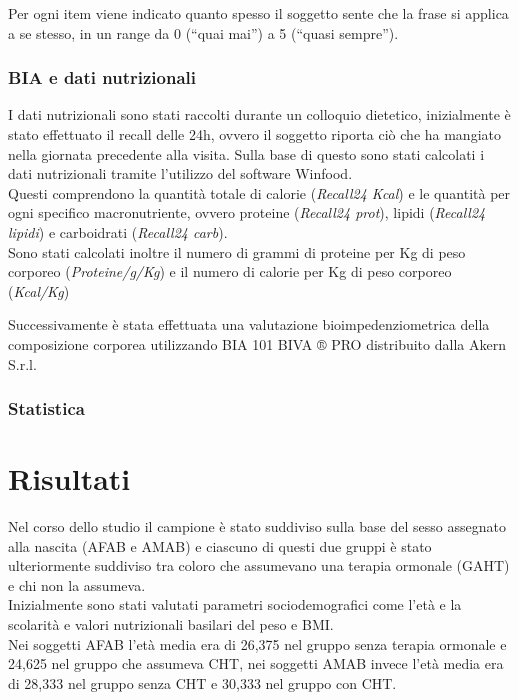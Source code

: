 \documentclass[12pt]{article}
\begin{document}
Per ogni item viene indicato quanto spesso il soggetto sente che la frase si applica a se stesso, in un range da 0 (``quai mai'') a 5 (``quasi sempre'').
\subsubsection{BIA e dati nutrizionali}
\label{sec:org8050c52}
I dati nutrizionali sono stati raccolti durante un colloquio dietetico, inizialmente è stato effettuato il recall delle 24h, ovvero il soggetto riporta ciò che ha mangiato nella giornata precedente alla visita. Sulla base di questo sono stati calcolati i dati nutrizionali tramite l'utilizzo del software Winfood.\\
Questi comprendono la quantità totale di calorie (\emph{Recall24 Kcal}) e le quantità per ogni specifico macronutriente, ovvero proteine (\emph{Recall24 prot}), lipidi (\emph{Recall24 lipidi}) e carboidrati (\emph{Recall24 carb}).\\
Sono stati calcolati inoltre il numero di grammi di proteine per Kg di peso corporeo (\emph{Proteine/g/Kg}) e il numero di calorie per Kg di peso corporeo (\emph{Kcal/Kg})

Successivamente è stata effettuata una valutazione bioimpedenziometrica della composizione corporea utilizzando BIA 101 BIVA ® PRO distribuito dalla Akern S.r.l.
\subsubsection{Statistica}
\label{sec:orgee2d86c}
\section{Risultati}
\label{sec:orgd22a09c}
Nel corso dello studio il campione è stato suddiviso sulla base del sesso assegnato alla nascita (AFAB e AMAB) e ciascuno di questi due gruppi è stato ulteriormente suddiviso tra coloro che assumevano una terapia ormonale (GAHT) e chi non la assumeva.\\

Inizialmente sono stati valutati parametri sociodemografici come l'età e la scolarità e valori nutrizionali basilari del peso e BMI.\\
Nei soggetti AFAB l'età media era di 26,375 nel gruppo senza terapia ormonale e 24,625 nel gruppo che assumeva CHT, nei soggetti AMAB invece l'età media era di 28,333 nel gruppo senza CHT e 30,333 nel gruppo con CHT.\\
\end{document}
